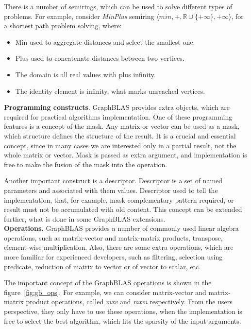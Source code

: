 There is a number of semirings, which can be used to solve different types of problems. For example, consider \textit{MinPlus} semiring $\langle min, +, \mathbb{R} \cup \{+\infty\}, +\infty \rangle$, for a shortest path problem solving, where:

\begin{itemize}
    \item Min used to aggregate distances and select the smallest one.
    \item Plus used to concatenate distances between two vertices.
    \item The domain is all real values with plus infinity.
    \item The identity element is infinity, what marks unreached vertices.
\end{itemize}

\textbf{Programming constructs}. GraphBLAS provides extra objects, which are required for practical algorithms implementation. One of these programming features is a concept of the mask. Any matrix or vector can be used as a mask, which structure defines the structure of the result. It is a crucial and essential concept, since in many cases we are interested only in a partial result, not the whole matrix or vector. Mask is passed as extra argument, and implementation is free to make the fusion of the mask into the operation.

Another important construct is a descriptor. Descriptor is a set of named parameters and associated with them values. Descriptor used to tell the implementation, that, for example, mask complementary pattern required, or result must not be accumulated with old content. This concept can be extended further, what is done in some GraphBLAS extensions.\\

\textbf{Operations.} GraphBLAS provides a number of commonly used linear algebra operations, such as matrix-vector and matrix-matrix products, transpose, element-wise multiplication. Also, there are some extra operations, which are more familiar for experienced developers, such as filtering, selection using predicate, reduction of matrix to vector or of vector to scalar, etc.

The important concept of the GraphBLAS operations is shown in the figure~\ref{fig:gb_ops}. For example, we can consider matrix-vector and matrix-matrix product operations, called \textit{mxv} and \textit{mxm} respectively. From the users perspective, they only have to use these operations, when the implementation is free to select the best algorithm, which fits the sparsity of the input arguments.\\

